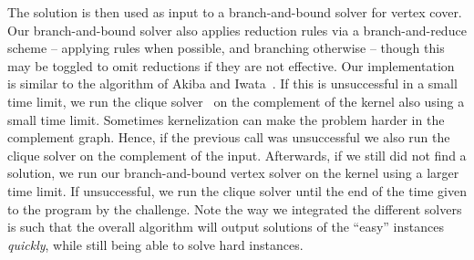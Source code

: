 \documentclass[a4paper,UKenglish]{lipics-v2016}
\begin{document}
The solution is then used as input to a branch-and-bound solver for vertex cover. Our branch-and-bound solver also applies reduction rules via a branch-and-reduce scheme -- applying rules when possible, and branching otherwise -- though this may be toggled to omit reductions if they are not effective.
Our implementation is similar to the algorithm of Akiba and Iwata~\cite{akiba-tcs-2016}. If this is unsuccessful in a small time limit, we run the clique solver~\cite{DBLP:journals/cor/LiJM17} on the complement of the kernel also using a small time limit. Sometimes kernelization can make the problem harder in the complement graph. Hence, if the previous call was unsuccessful we also run the clique solver on the complement of the input. Afterwards, if we still did not find a solution, we run our branch-and-bound vertex solver on the kernel using a larger time limit. If unsuccessful, we run the clique solver until the end of the time given to the program by the challenge. Note the way we integrated the different solvers is such that the overall algorithm will output solutions of the ``easy'' instances \emph{quickly}, while still being able to solve hard instances.



\end{document}
